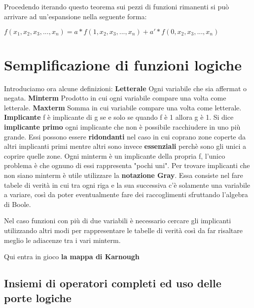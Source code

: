 \documentclass{book}
\begin{document}
\paragraph*{}
Procedendo iterando questo teorema sui pezzi di funzioni rimanenti si può arrivare ad un'espansione nella seguente forma:


\(f({x_1},{x_2},{x_3},...,{x_n})=a*f(1,{x_2},{x_3},...,{x_n})+a'*f(0,{x_2},{x_3},...,{x_n})\)

\newpage

\chapter{Semplificazione di funzioni logiche}
Introduciamo ora alcune definizioni:\newline\break
\textbf{Letterale}
Ogni variabile che sia affermat o negata.\break
\textbf{Minterm}
Prodotto in cui ogni variabile compare una volta come letterale.\break
\textbf{Maxterm}
Somma in cui variabile compare una volta come letterale.\break
\textbf{Implicante}
f è implicante di g se e solo se quando f è 1 allora g è 1.
\newline Si dice \textbf{implicante primo} ogni implicante che non è possibile racchiudere in uno più grande.
Essi possono essere \textbf{ridondanti} nel caso in cui coprano zone coperte da altri implicanti primi mentre altri sono invece \textbf{essenziali} perchè sono gli unici a coprire quelle zone.
\newline\break
Ogni minterm è un implicante della propria f, l'unico problema è che ognuno di essi rappresenta "pochi uni".\newline\break
Per trovare implicanti che non siano minterm è utile utilizzare la \textbf{notazione Gray}.
Essa consiste nel fare tabele di verità in cui tra ogni riga e la sua successiva c'è solamente una variabile a variare, così da poter eventualmente fare dei raccoglimenti sfruttando l'algebra di Boole.

Nel caso funzioni con più di due variabili è necessario cercare gli implicanti utilizzando altri modi per rappresentare le tabelle di verità così da far risaltare meglio le adiacenze tra i vari minterm.

Qui entra in gioco \textbf{la mappa di Karnough}

\newpage
\section{Insiemi di operatori completi ed uso delle porte logiche}
\end{document}
